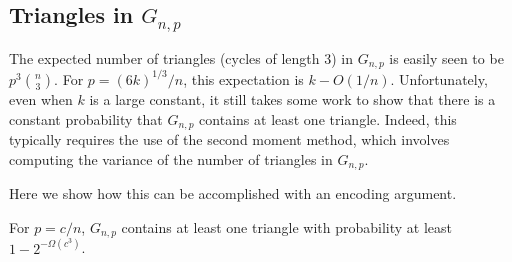 \documentclass{patmorin}
\begin{document}
\subsection{Triangles in $G_{n,p}$}

The expected number of triangles (cycles of length 3) in $G_{n,p}$
is easily seen to be $p^3\binom{n}{3}$.  For $p=(6k)^{1/3}/n$, this
expectation is $k-O(1/n)$.  Unfortunately, even when $k$ is a large
constant, it still takes some work to show that there is a constant
probability that $G_{n,p}$ contains at least one triangle. Indeed, this
typically requires the use of the second moment method, which involves
computing the variance of the number of triangles in $G_{n,p}$.

Here we show how this can be accomplished with an encoding argument.

\begin{thm}
  For $p=c/n$, $G_{n,p}$ contains at least one triangle with probability
  at least $1-2^{-\Omega(c^3)}$.
\end{thm}
\end{document}
